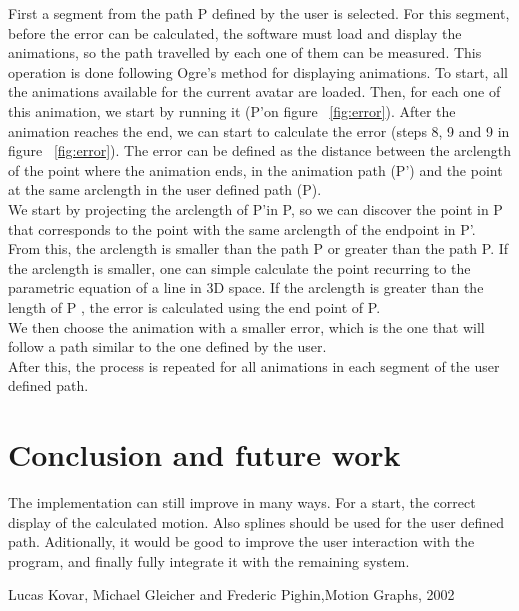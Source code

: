 \documentclass[a4paper]{article}
\begin{document}
First a segment from the path P defined by the user is selected. For this segment, before the error can be calculated, the software must load and display the animations, so the path travelled by each one of them can be measured. This operation is done following Ogre\textquoteright s method for displaying animations. To start, all the animations available for the current avatar are loaded. Then, for each one of this animation, we start by running it (P\textquoteright on figure ~\ref{fig:error}). After the animation reaches the end, we can start to calculate the error (steps 8, 9 and 9 in figure ~\ref{fig:error}). The error can be defined as the distance between the arclength of the point where the animation ends, in the animation path (P\textquoteright) and the point at the same arclength in the user defined path (P).  
\\

We start by projecting the arclength of P\textquoteright in P, so we can discover the point in P that corresponds to the point with the same arclength of the endpoint in P\textquoteright. From this, the arclength is smaller than the path P or greater than the path P.  If the arclength is smaller, one can simple calculate the point recurring to the parametric equation of a line in 3D space.  If the arclength is greater than the length of P , the error is calculated using the end point of P. 
\\

We then choose the animation with a smaller error, which is the one that will follow a path similar to the one defined by the user. 
\\

After this, the process is repeated for all animations in each segment of the user defined path. 






\section{Conclusion and future work}
The implementation can still improve in many ways. For a start, the correct display of the calculated motion. Also splines should be used for the user defined path. Aditionally, it would be good to improve the user interaction with the program, and finally fully integrate it with the remaining system.





\begin{thebibliography}{}

{Lucas Kovar, Michael Gleicher and Frederic Pighin},{Motion Graphs}, {2002}
    
    
\end{thebibliography} 
\end{document}
